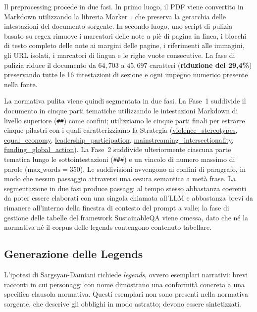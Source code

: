 \documentclass[pdflatex, sn-apa]{sn-jnl}%
\theoremstyle{thmstyleone}%
\theoremstyle{thmstyletwo}%
\theoremstyle{thmstylethree}%
\begin{document}
Il preprocessing procede in due fasi. In primo luogo, il PDF viene convertito in
Markdown utilizzando la libreria Marker~\citep{paruchuri2024marker}, che preserva
la gerarchia delle intestazioni del documento sorgente. In secondo luogo, uno
script di pulizia basato su regex rimuove i marcatori delle note a piè di pagina
in linea, i blocchi di testo completo delle note ai margini delle pagine, i
riferimenti alle immagini, gli URL isolati, i marcatori di lingua e le righe vuote
consecutive.
La fase di pulizia riduce il documento da $64{,}703$ a $45{,}697$ caratteri
(\textbf{riduzione del 29,4\%}) preservando tutte le 16 intestazioni di sezione e
ogni impegno numerico presente nella fonte.

La normativa pulita viene quindi segmentata in due fasi. La Fase~1 suddivide il
documento in cinque parti tematiche utilizzando le intestazioni Markdown di
livello superiore ({\small\texttt{\#\#}}) come confini; utilizziamo le cinque
parti finali per estrarre cinque pilastri con i quali caratterizziamo la
Strategia (\url{violence_stereotypes}, \url{equal_economy},
\url{leadership_participation}, \url{mainstreaming_intersectionality},
\url{funding_global_action}). La Fase~2 suddivide ulteriormente ciascuna parte
tematica lungo le sottointestazioni ({\small\texttt{\#\#\#}}) e un vincolo di
numero massimo di parole ($\text{max\_words} = 350$). Le suddivisioni avvengono ai
confini di paragrafo, in modo che nessun passaggio attraversi una cesura
semantica a metà frase. La segmentazione in due fasi produce passaggi al tempo
stesso abbastanza coerenti da poter essere elaborati con una singola chiamata
all'LLM e abbastanza brevi da rimanere all'interno della finestra di contesto del
prompt a valle; la fase di gestione delle tabelle del framework SustainableQA
viene omessa, dato che né la normativa né il corpus delle legends contengono
contenuto tabellare.

\subsection{Generazione delle Legends}
\label{sec:method:legends}


L'ipotesi di Sargsyan-Damiani richiede \emph{legends}, ovvero esemplari
narrativi: brevi racconti in cui personaggi con nome dimostrano una conformità
concreta a una specifica clausola normativa. Questi esemplari non sono presenti
nella normativa sorgente, che descrive gli obblighi in modo astratto; devono
essere sintetizzati.
\end{document}
